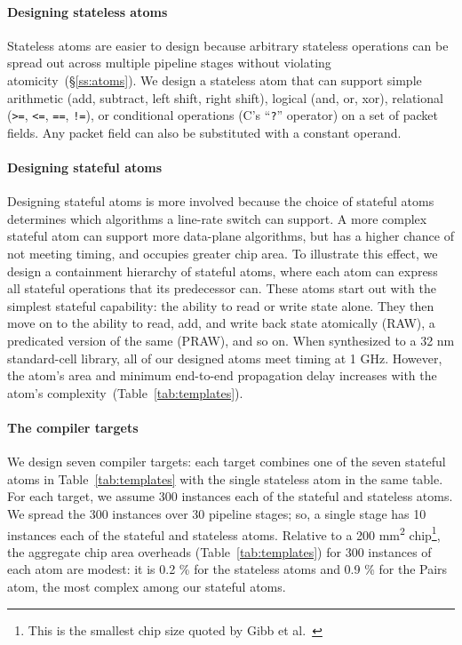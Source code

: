 \paragraph{Designing stateless atoms}
Stateless atoms are easier to design because arbitrary stateless operations can
be spread out across multiple pipeline stages without violating
atomicity~(\S\ref{ss:atoms}). We design a stateless atom that can support
simple arithmetic (add, subtract, left shift, right shift), logical (and, or,
xor), relational ({\tt >=}, {\tt <=}, {\tt ==}, {\tt !=}), or conditional
operations (C's ``{\tt ?}'' operator) on a set of packet fields. Any packet
field can also be substituted with a constant operand.

\paragraph{Designing stateful atoms}
Designing stateful atoms is more involved because the choice of stateful atoms
determines which algorithms a line-rate switch can support. A more complex
stateful atom can support more data-plane algorithms, but has a higher chance
of not meeting timing, and occupies greater chip area. To illustrate this
effect, we design a containment hierarchy of stateful atoms, where each atom
can express all stateful operations that its predecessor can. These
atoms start out with the simplest stateful capability: the ability to read or
write state alone.  They then move on to the ability to read, add, and write
back state atomically (RAW), a predicated version of the same (PRAW), and so
on. When synthesized to a 32 nm standard-cell library, all of our designed
atoms meet timing at 1 GHz. However, the atom's area and minimum end-to-end
propagation delay increases with the atom's
complexity~(Table~\ref{tab:templates}).

\paragraph{The compiler targets}
We design seven compiler targets: each target combines one of the seven
stateful atoms in Table~\ref{tab:templates} with the single stateless atom in
the same table. For each target, we assume 300 instances each of the stateful
and stateless atoms. We spread the 300 instances over 30 pipeline stages; so, a
single stage has 10 instances each of the stateful and stateless atoms.
Relative to a 200 \si{\milli\metre\squared} chip\footnote{This is the smallest
chip size quoted by Gibb et al.~\cite{gibb_parsing}}, the aggregate chip area
overheads (Table~\ref{tab:templates}) for 300 instances of each atom are
modest: it is 0.2 \% for the stateless atoms and 0.9 \% for the Pairs atom, the
most complex among our stateful atoms.

